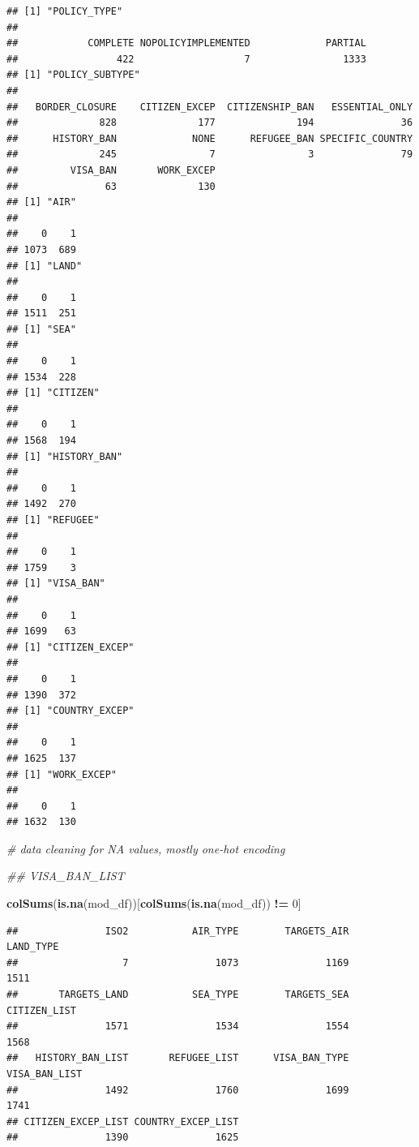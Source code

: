 \documentclass[]{article}
\newenvironment{Shaded}{\begin{snugshade}}{\end{snugshade}}
\newcommand{\CommentTok}[1]{\textcolor[rgb]{0.56,0.35,0.01}{\textit{#1}}}
\newcommand{\DecValTok}[1]{\textcolor[rgb]{0.00,0.00,0.81}{#1}}
\newcommand{\KeywordTok}[1]{\textcolor[rgb]{0.13,0.29,0.53}{\textbf{#1}}}
\newcommand{\NormalTok}[1]{#1}
\newcommand{\OperatorTok}[1]{\textcolor[rgb]{0.81,0.36,0.00}{\textbf{#1}}}
\newcommand{\StringTok}[1]{\textcolor[rgb]{0.31,0.60,0.02}{#1}}
\begin{document}
\begin{verbatim}
## [1] "POLICY_TYPE"
## 
##            COMPLETE NOPOLICYIMPLEMENTED             PARTIAL 
##                 422                   7                1333 
## [1] "POLICY_SUBTYPE"
## 
##   BORDER_CLOSURE    CITIZEN_EXCEP  CITIZENSHIP_BAN   ESSENTIAL_ONLY 
##              828              177              194               36 
##      HISTORY_BAN             NONE      REFUGEE_BAN SPECIFIC_COUNTRY 
##              245                7                3               79 
##         VISA_BAN       WORK_EXCEP 
##               63              130 
## [1] "AIR"
## 
##    0    1 
## 1073  689 
## [1] "LAND"
## 
##    0    1 
## 1511  251 
## [1] "SEA"
## 
##    0    1 
## 1534  228 
## [1] "CITIZEN"
## 
##    0    1 
## 1568  194 
## [1] "HISTORY_BAN"
## 
##    0    1 
## 1492  270 
## [1] "REFUGEE"
## 
##    0    1 
## 1759    3 
## [1] "VISA_BAN"
## 
##    0    1 
## 1699   63 
## [1] "CITIZEN_EXCEP"
## 
##    0    1 
## 1390  372 
## [1] "COUNTRY_EXCEP"
## 
##    0    1 
## 1625  137 
## [1] "WORK_EXCEP"
## 
##    0    1 
## 1632  130
\end{verbatim}

\begin{Shaded}
\begin{Highlighting}[]
\CommentTok{# data cleaning for NA values, mostly one-hot encoding}

\CommentTok{## VISA_BAN_LIST}

\KeywordTok{colSums}\NormalTok{(}\KeywordTok{is.na}\NormalTok{(mod_df))[}\KeywordTok{colSums}\NormalTok{(}\KeywordTok{is.na}\NormalTok{(mod_df)) }\OperatorTok{!=}\StringTok{ }\DecValTok{0}\NormalTok{]}
\end{Highlighting}
\end{Shaded}

\begin{verbatim}
##               ISO2           AIR_TYPE        TARGETS_AIR          LAND_TYPE 
##                  7               1073               1169               1511 
##       TARGETS_LAND           SEA_TYPE        TARGETS_SEA       CITIZEN_LIST 
##               1571               1534               1554               1568 
##   HISTORY_BAN_LIST       REFUGEE_LIST      VISA_BAN_TYPE      VISA_BAN_LIST 
##               1492               1760               1699               1741 
## CITIZEN_EXCEP_LIST COUNTRY_EXCEP_LIST 
##               1390               1625
\end{verbatim}
\end{document}
